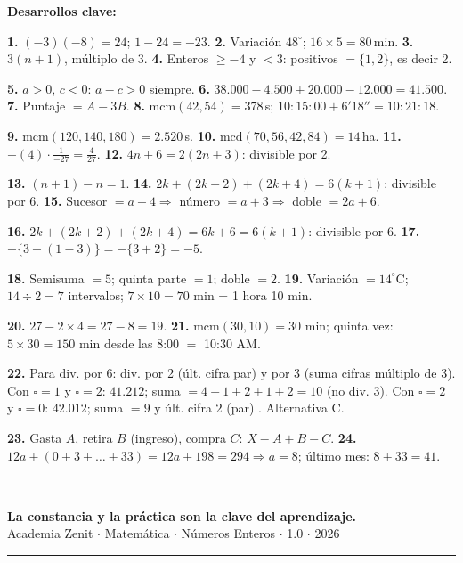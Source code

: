 \documentclass[11pt, letterpaper]{article}
\begin{document}
\medskip
\textbf{Desarrollos clave:}

\textbf{1.} $(-3)(-8)=24$; $1-24=-23$. \quad \textbf{2.} Variaci\'on $48^\circ$; $16\times 5=80$\,min. \quad \textbf{3.} $3(n+1)$, m\'ultiplo de 3. \quad \textbf{4.} Enteros $\geq -4$ y $<3$: positivos $=\{1,2\}$, es decir 2.

\textbf{5.} $a>0$, $c<0$: $a-c>0$ siempre. \quad \textbf{6.} $38.000-4.500+20.000-12.000=41.500$. \quad \textbf{7.} Puntaje $=A-3B$. \quad \textbf{8.} $\text{mcm}(42,54)=378$\,s; $10{:}15{:}00+6'18''=10{:}21{:}18$.

\textbf{9.} $\text{mcm}(120,140,180)=2.520$\,s. \quad \textbf{10.} $\text{mcd}(70,56,42,84)=14$\,ha. \quad \textbf{11.} $-(4)\cdot\frac{1}{-27}=\frac{4}{27}$. \quad \textbf{12.} $4n+6=2(2n+3)$: divisible por 2.

\textbf{13.} $(n+1)-n=1$. \quad \textbf{14.} $2k+(2k+2)+(2k+4)=6(k+1)$: divisible por 6. \quad \textbf{15.} Sucesor $=a+4\Rightarrow$ n\'umero $=a+3\Rightarrow$ doble $=2a+6$.

\textbf{16.} $2k+(2k+2)+(2k+4)=6k+6=6(k+1)$: divisible por 6. \quad \textbf{17.} $-\{3-(1-3)\}=-\{3+2\}=-5$.

\textbf{18.} Semisuma $=5$; quinta parte $=1$; doble $=2$. \quad \textbf{19.} Variaci\'on $=14^\circ$C; $14\div 2=7$ intervalos; $7\times 10=70$ min = 1 hora 10 min.

\textbf{20.} $27-2\times 4=27-8=19$. \quad \textbf{21.} $\text{mcm}(30,10)=30$ min; quinta vez: $5\times 30=150$ min desde las 8:00 $=$ 10:30 AM.

\textbf{22.} Para div. por 6: div. por 2 (\'ult. cifra par) y por 3 (suma cifras m\'ultiplo de 3). Con $\square=1$ y $\square=2$: $41.212$; suma $=4+1+2+1+2=10$ (no div. 3). Con $\square=2$ y $\square=0$: $42.012$; suma $=9$ \checkmark{} y \'ult. cifra $2$ (par) \checkmark{}. Alternativa C.

\textbf{23.} Gasta $A$, retira $B$ (ingreso), compra $C$: $X-A+B-C$. \quad \textbf{24.} $12a+(0+3+\ldots+33)=12a+198=294\Rightarrow a=8$; \'ultimo mes: $8+33=41$.

\vspace{8pt}
\begin{center}
  \rule{\linewidth}{1.5pt}\\[4pt]
  {\large\bfseries\color{zenitnavy} La constancia y la pr\'actica son la clave del aprendizaje.}\\[2pt]
  {\color{zenitgold}\small Academia Zenit $\cdot$ Matem\'atica $\cdot$ N\'umeros Enteros $\cdot$ 1.0 $\cdot$ 2026}
  \rule{\linewidth}{1.5pt}
\end{center}
\end{document}
